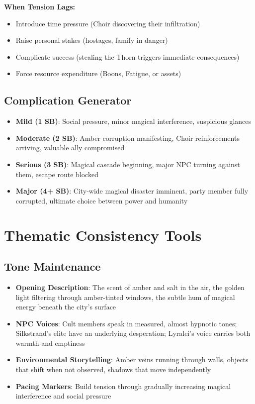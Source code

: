 \documentclass[11pt]{article}
\begin{document}
\textbf{When Tension Lags:}
\begin{itemize}
  \item Introduce time pressure (Choir discovering their infiltration)
  \item Raise personal stakes (hostages, family in danger)
  \item Complicate success (stealing the Thorn triggers immediate consequences)
  \item Force resource expenditure (Boons, Fatigue, or assets)
\end{itemize}

\subsection*{Complication Generator}

\begin{itemize}
  \item \textbf{Mild (1 SB)}: Social pressure, minor magical interference, suspicious glances
  \item \textbf{Moderate (2 SB)}: Amber corruption manifesting, Choir reinforcements arriving, valuable ally compromised
  \item \textbf{Serious (3 SB)}: Magical cascade beginning, major NPC turning against them, escape route blocked
  \item \textbf{Major (4+ SB)}: City-wide magical disaster imminent, party member fully corrupted, ultimate choice between power and humanity
\end{itemize}

\section*{Thematic Consistency Tools}

\subsection*{Tone Maintenance}

\begin{itemize}
  \item \textbf{Opening Description}: The scent of amber and salt in the air, the golden light filtering through amber-tinted windows, the subtle hum of magical energy beneath the city's surface
  \item \textbf{NPC Voices}: Cult members speak in measured, almost hypnotic tones; Silkstrand's elite have an underlying desperation; Lyralei's voice carries both warmth and emptiness
  \item \textbf{Environmental Storytelling}: Amber veins running through walls, objects that shift when not observed, shadows that move independently
  \item \textbf{Pacing Markers}: Build tension through gradually increasing magical interference and social pressure
\end{itemize}
\end{document}
